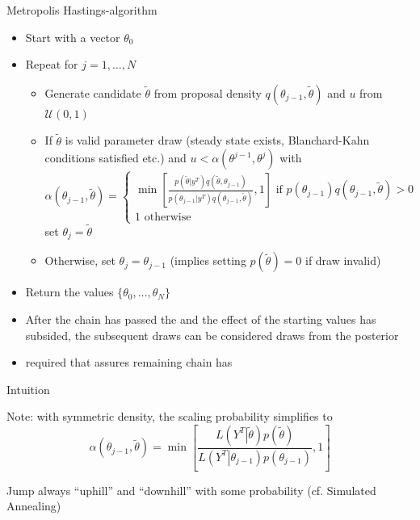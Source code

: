 \begin{frame}{Metropolis Hastings-algorithm}
\begin{itemize}
    \item Start with a vector $\theta_0$
    \item Repeat for $j=1,\ldots,N$
    \begin{itemize}
        \item Generate candidate $\tilde \theta$ from proposal density $q(\theta_{j-1},\tilde \theta)$ and $u$ from $\mathcal{U}(0,1)$
        \item If $\tilde \theta$ is valid parameter draw (steady state exists, Blanchard-Kahn conditions satisfied etc.) and $u<\alpha(\theta^{j-1},\theta^{j})$ with
        \begin{equation}
        \alpha \left( {\theta_{j-1},\tilde \theta} \right) = \left\{ {\begin{array}{*{20}{c}}
            {\min \left[ {\frac{{p \left( \tilde \theta | y^T\right)q\left( {\tilde \theta,\theta_{j-1}} \right)}}{{p \left(\theta_{j-1} | y^T\right)q\left( {\theta_{j-1},\tilde \theta} \right)}},1} \right] \text{ if }p \left( \theta_{j-1} \right)q\left( {\theta_{j-1},\tilde \theta} \right) > 0} \\
            {1 \text{ otherwise} }
            \end{array}} \right.
        \end{equation}
        set $\theta_j=\tilde \theta$
        \item Otherwise, set $\theta_j=\theta_{j-1}$ (implies setting $p(\tilde \theta)=0$ if draw invalid)
    \end{itemize}
    \item Return the values $\{\theta_0,\ldots,\theta_N\}$
    \item After the chain has passed the  and the effect of the starting values has subsided, the subsequent draws can be considered draws from the posterior
    \item[$\Rightarrow$]  required that assures remaining chain has 
\end{itemize}
\end{frame}


\begin{frame}{Intuition}
\begin{witemize}
    \item Note: with symmetric density, the scaling probability simplifies to
    \begin{equation}
        \alpha \left( {{\theta _{j - 1}},\tilde \theta} \right) = \min \left[ {\frac{{L\left( {\left. {{Y^T}} \right|\tilde \theta} \right)p\left( \tilde \theta \right)}}{{L\left( {\left. {{Y^T}} \right|{\theta _{j - 1}}} \right)p\left( {{\theta _{j - 1}}} \right)}},1} \right]
    \end{equation}
    \item Jump always ``uphill'' and ``downhill'' with some probability (cf. Simulated Annealing)
\end{witemize}
\end{frame}

